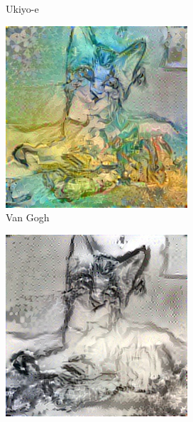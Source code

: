 \documentclass[10pt,twocolumn,letterpaper]{article}
\begin{document}
\begin{figure}
\begin{subfigure}[b]{0.18\textwidth}
    \caption{Ukiyo-e}
    \label{fig::base23}
  \end{subfigure}
  \begin{subfigure}[b]{0.18\textwidth}
    \includegraphics[width=\textwidth]{figure/baseline4/fg.jpg}
    \caption{Van Gogh}
    \label{fig::base24}
  \end{subfigure}
  \begin{subfigure}[b]{0.18\textwidth}
    \includegraphics[width=\textwidth]{figure/baseline4/chinese.jpg}

\end{subfigure}
\end{figure}
\end{document}
